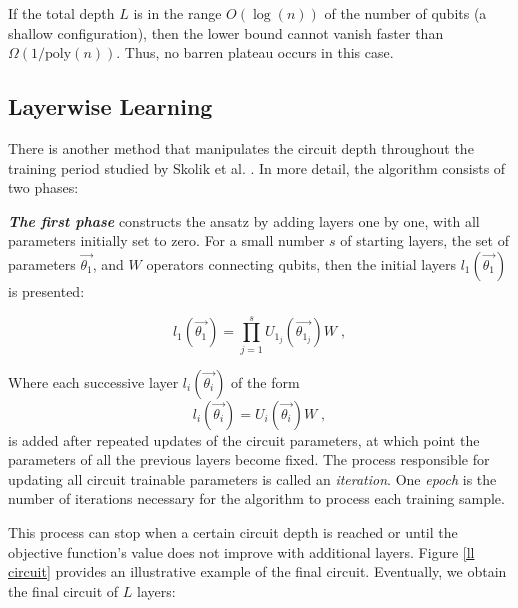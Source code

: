 If the total depth $L$ is in the range $O(\log(n))$ of the number of qubits (a shallow configuration), then the lower bound cannot vanish faster than $\Omega(1/\mathrm{poly}(n))$.
Thus, no barren plateau occurs in this case.



\subsection{Layerwise Learning} \label{Sec: Layerwise Learning}

There is another method that manipulates the circuit depth throughout the training period studied by Skolik et al. \cite{skolikLayerwiseLearningQuantum2021}.
In more detail, the algorithm consists of two phases:

\textbf{\emph{The first phase}} constructs the ansatz by adding layers one by one, with all parameters initially set to zero. For a small number $s$ of starting layers, the set of parameters $\vec{\theta_1}$, and $W$ operators connecting qubits, then the initial layers $l_1(\vec{\theta_1})$ is presented:

\begin{equation}
    l_1(\vec{\theta_1})
    = \prod_{j=1}^s U_{1_j}(\vec{\theta_{1_j}}) W \;,
\end{equation}

Where each successive layer $l_i(\vec{\theta_i})$ of the form
\begin{equation}
    l_i(\vec{\theta_i})
    =U_i(\vec{\theta_i}) W \;,
\end{equation}
is added after repeated updates of the circuit parameters, at which point the parameters of all the previous layers become fixed.
The process responsible for updating all circuit trainable parameters is called an \emph{iteration}. One \emph{epoch} is the number of iterations necessary for the algorithm to process each training sample.

This process can stop when a certain circuit depth is reached or until the objective function's value does not improve with additional layers.
Figure \ref{ll circuit} provides an illustrative example of the final circuit.
Eventually, we obtain the final circuit of $L$ layers:

